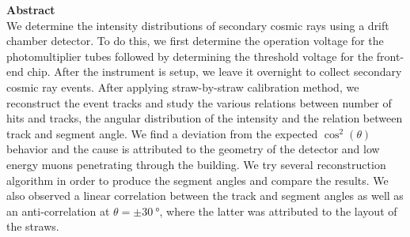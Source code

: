 \documentclass[a4paper]{report}
\numberwithin{equation}{section}
\begin{document}
\begin{titlepage}
	\vspace*{5em}

	\begin{minipage}{0.8\textwidth}
		\begin{centering}
			\textbf{Abstract}\\[0.2cm]
            We determine the intensity distributions of secondary cosmic rays using a drift chamber detector.
			 To do this, we first determine the operation voltage for the photomultiplier tubes followed 
			 by determining the threshold voltage for the front-end chip. After the instrument is setup, we 
			 leave it overnight to collect secondary cosmic ray events. After applying straw-by-straw calibration method,
			  we reconstruct the event tracks and study the various relations between number of hits and tracks, the angular
			   distribution of the intensity and the relation between track and segment angle. We find a 
			   deviation from the expected $\cos^2(\theta)$ behavior and the cause is attributed to the geometry of the detector 
			   and low energy muons penetrating through the building. We try several reconstruction algorithm in order to produce the segment angles and compare the results. We also observed a linear correlation between the track and segment angles as well as an anti-correlation at $\theta = \pm \SI{30}{\degree}$, where the latter was attributed to 
			   the layout of the straws. 
		\end{centering}
	\end{minipage}
	
	
	
	
	
	
	 
	
	
\end{titlepage}
\end{document}
